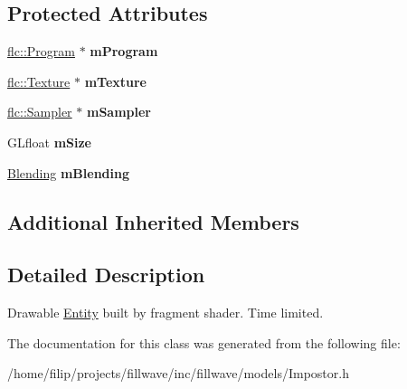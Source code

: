 \subsection*{Protected Attributes}
\begin{DoxyCompactItemize}
\item 
\mbox{\label{classflw_1_1flf_1_1Impostor_ac5fc51278468676481f5d26523b90aa6}} 
\hyperlink{classflw_1_1flc_1_1Program}{flc\+::\+Program} $\ast$ {\bfseries m\+Program}
\item 
\mbox{\label{classflw_1_1flf_1_1Impostor_a79b817d46dd91909fc060ff0b557bde0}} 
\hyperlink{classflw_1_1flc_1_1Texture}{flc\+::\+Texture} $\ast$ {\bfseries m\+Texture}
\item 
\mbox{\label{classflw_1_1flf_1_1Impostor_abfec71be3aa6a5e08ae046f81484f0a3}} 
\hyperlink{classflw_1_1flc_1_1Sampler}{flc\+::\+Sampler} $\ast$ {\bfseries m\+Sampler}
\item 
\mbox{\label{classflw_1_1flf_1_1Impostor_a3c0213e10db85ca55391c1629e82397a}} 
G\+Lfloat {\bfseries m\+Size}
\item 
\mbox{\label{classflw_1_1flf_1_1Impostor_a36c13287a923fc431368cf82f8d6d358}} 
\hyperlink{structflw_1_1flf_1_1Blending}{Blending} {\bfseries m\+Blending}
\end{DoxyCompactItemize}
\subsection*{Additional Inherited Members}


\subsection{Detailed Description}
Drawable \hyperlink{classflw_1_1flf_1_1Entity}{Entity} built by fragment shader. Time limited. 

The documentation for this class was generated from the following file\+:\begin{DoxyCompactItemize}
\item 
/home/filip/projects/fillwave/inc/fillwave/models/Impostor.\+h\end{DoxyCompactItemize}
